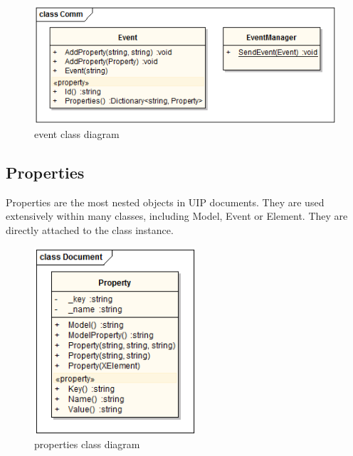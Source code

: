\begin{figure}[ht!]
\centering
\includegraphics[width=130mm]{pics/3/classEvent.png}
\caption{event class diagram}
\label{fig:classEvent}
\end{figure}

\subsection{Properties}
Properties are the most nested objects in UIP documents. They are used extensively within many classes, including Model, Event or Element. They are directly attached to the class instance.

\begin{figure}[ht!]
\centering
\includegraphics[width=60mm]{pics/3/classProperty.png}
\caption{properties class diagram}
\label{fig:classProperty}
\end{figure}

